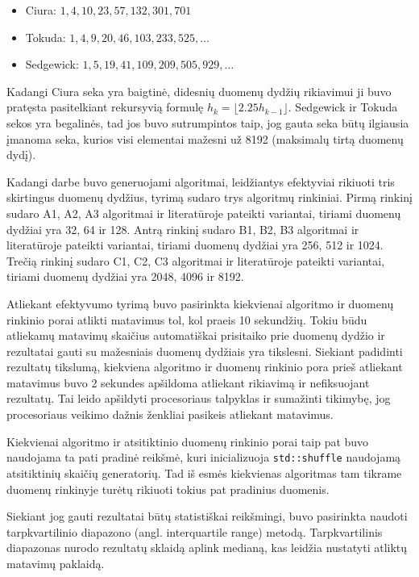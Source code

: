 \documentclass{VUMIFInfBakalaurinis}
\begin{document}
\begin{itemize}
  \item Ciura: $1, 4, 10, 23, 57, 132, 301, 701$ \cite{ciura2001best}
  \item Tokuda: $1, 4, 9, 20, 46, 103, 233, 525, \ldots $ \cite{tokuda1992}
  \item Sedgewick: $1, 5, 19, 41, 109, 209, 505, 929, \ldots$ \cite{SEDGEWICK1986159}
\end{itemize}

Kadangi Ciura seka yra baigtinė, didesnių duomenų dydžių rikiavimui ji buvo pratęsta pasitelkiant rekursyvią formulę $h_{k}=\lfloor 2.25h_{k-1}\rfloor$.
Sedgewick ir Tokuda sekos yra begalinės, tad jos buvo sutrumpintos taip, jog gauta seka būtų ilgiausia įmanoma seka, kurios visi elementai mažesni už 8192 (maksimalų tirtą duomenų dydį).

Kadangi darbe buvo generuojami algoritmai, leidžiantys efektyviai rikiuoti tris skirtingus duomenų dydžius, tyrimą sudaro trys algoritmų rinkiniai.
Pirmą rinkinį sudaro A1, A2, A3 algoritmai ir literatūroje pateikti variantai, tiriami duomenų dydžiai yra 32, 64 ir 128.
Antrą rinkinį sudaro B1, B2, B3 algoritmai ir literatūroje pateikti variantai, tiriami duomenų dydžiai yra 256, 512 ir 1024.
Trečią rinkinį sudaro C1, C2, C3 algoritmai ir literatūroje pateikti variantai, tiriami duomenų dydžiai yra 2048, 4096 ir 8192.

Atliekant efektyvumo tyrimą buvo pasirinkta kiekvienai algoritmo ir duomenų rinkinio porai
atlikti matavimus tol, kol praeis 10 sekundžių.
Tokiu būdu atliekamų matavimų skaičius automatiškai prisitaiko prie duomenų dydžio
ir rezultatai gauti su mažesniais duomenų dydžiais yra tikslesni.
Siekiant padidinti rezultatų tikslumą, kiekviena algoritmo ir duomenų rinkinio pora
prieš atliekant matavimus buvo 2 sekundes apšildoma atliekant rikiavimą ir nefiksuojant rezultatų.
Tai leido apšildyti procesoriaus talpyklas ir sumažinti tikimybę,
jog procesoriaus veikimo dažnis ženkliai pasikeis atliekant matavimus.

Kiekvienai algoritmo ir atsitiktinio duomenų rinkinio porai taip pat buvo naudojama ta pati pradinė reikšmė,
kuri inicializuoja \verb|std::shuffle| naudojamą atsitiktinių skaičių generatorių.
Tad iš esmės kiekvienas algoritmas tam tikrame duomenų rinkinyje turėtų rikiuoti tokius pat pradinius duomenis.

Siekiant jog gauti rezultatai būtų statistiškai reikšmingi, buvo pasirinkta naudoti tarpkvartilinio diapazono (angl. interquartile range) metodą.
Tarpkvartilinis diapazonas nurodo rezultatų sklaidą aplink medianą,
kas leidžia nustatyti atliktų matavimų paklaidą.
\end{document}

